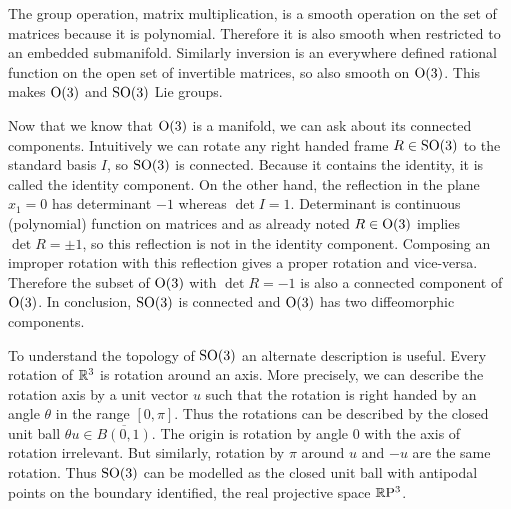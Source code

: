The group operation, matrix multiplication, is a smooth operation on the set of matrices because it is polynomial.
Therefore it is also smooth when restricted to an embedded submanifold.
Similarly inversion is an everywhere defined rational function on the open set of invertible matrices, so also smooth on $\mathrm{O}(3)$.
This makes $\mathrm{O}(3)$ and $\mathrm{SO}(3)$ Lie groups.

Now that we know that $\mathrm{O}(3)$ is a manifold, we can ask about its connected components.
Intuitively we can rotate any right handed frame $R \in \mathrm{SO}(3)$ to the standard basis $I$, so $\mathrm{SO}(3)$ is connected.
Because it contains the identity, it is called the identity component.
On the other hand, the reflection in the plane $x_1 = 0$ has determinant $-1$ whereas $\det I = 1$.
Determinant is continuous (polynomial) function on matrices and as already noted $R \in \mathrm{O}(3)$ implies $\det R = \pm 1$, so this reflection is not in the identity component.
Composing an improper rotation with this reflection gives a proper rotation and vice-versa. Therefore the subset of $\mathrm{O}(3)$ with $\det R = -1$ is also a connected component of $\mathrm{O}(3)$.
In conclusion, $\mathrm{SO}(3)$ is connected and $\mathrm{O}(3)$ has two diffeomorphic components.

To understand the topology of $\mathrm{SO}(3)$ an alternate description is useful.
Every rotation of $\mathbb{R}^3$ is rotation around an axis.
More precisely, we can describe the rotation axis by a unit vector $u$ such that the rotation is right handed by an angle $\theta$ in the range $[0,\pi]$.
Thus the rotations can be described by the closed unit ball $\theta u \in \overline{B(0,1)}$.
The origin is rotation by angle $0$ with the axis of rotation irrelevant.
But similarly, rotation by $\pi$ around $u$ and $-u$ are the same rotation.
Thus $\mathrm{SO}(3)$ can be modelled as the closed unit ball with antipodal points on the boundary identified, the real projective space $\mathbb{R}\mathrm{P}^3$.

